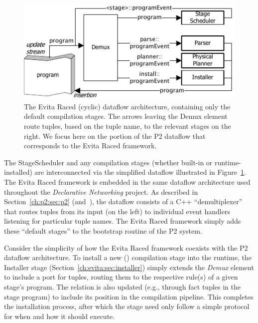 \begin{figure}[htbp]
\begin{center}
\includegraphics[scale=1.5]{figures/DefaultCompiler}
\ssp
\caption{The Evita Raced (cyclic) dataflow architecture, containing only the 
default compilation stages. The arrows leaving the Demux element
route tuples, based on the tuple name, to the relevant stages on the right.
We focus here on the portion of the P2 dataflow that corresponds 
to the Evita Raced framework.}
\label{ch:evita:fig:basecompiler}
\end{center}
\end{figure}

The StageScheduler and any compilation stages (whether built-in or
runtime-installed) are interconnected via the simplified dataflow illustrated
in Figure~\ref{ch:evita:fig:basecompiler}.  The Evita Raced framework is
embedded in the same dataflow architecture used throughout the {\em Declarative
Networking} project.  As described in Section~\ref{ch:p2:sec:p2}
(and~\cite{p2:sosp}), the dataflow consists of a C++ ``demultiplexer'' that
routes tuples from its input (on the left) to individual event handlers
listening for particular tuple names.  The Evita Raced framework simply adds
these ``default stages'' to the bootstrap routine of the P2 system.

Consider the simplicity of how the Evita Raced framework coexists with the P2
dataflow architecture.  To install a new (\OVERLOG) compilation stage into the
runtime, the Installer stage (Section~\ref{ch:evita:sec:installer}) simply extends
the {\em Demux} element to include a port for 
tuples, routing them to the respective rule(s) of a given stage's \OVERLOG
program. The  relation is also updated (e.g., through fact tuples
in the \OVERLOG stage program) to include its position in the compilation pipeline.
This completes the installation process, after which the \OVERLOG stage need only 
follow a simple protocol for when and how it should execute. 

